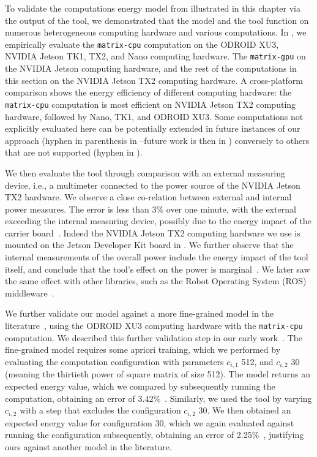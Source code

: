 To validate the computations energy model from  illustrated in this chapter via the output of the \powprof{} tool, we demonstrated that the model and the tool function on numerous heterogeneous computing hardware and various computations. In , we empirically evaluate the {\small\tt matrix-cpu} computation on the ODROID XU3, NVIDIA Jetson TK1, TX2, and Nano computing hardware. The {\small\tt matrix-gpu} on the NVIDIA Jetson computing hardware, and the rest of the computations in this section on the NVIDIA Jetson TX2 computing hardware. A cross-platform comparison shows the energy efficiency of different computing hardware: the {\small\tt matrix-cpu} computation is most efficient on NVIDIA Jetson TX2 computing hardware, followed by Nano, TK1, and ODROID XU3. Some computations not explicitly evaluated here can be potentially extended in future instances of our approach (hyphen in parenthesis in --future work is then in ) conversely to others that are not supported (hyphen in ). 

We then evaluate the \powprof{} tool through comparison with an external measuring device, i.e., a multimeter connected to the power source of the NVIDIA Jetson TX2 hardware. We observe a close co-relation between external and internal power measures. The error is less than 3\% over one minute, with the external exceeding the internal measuring device, possibly due to the energy impact of the carrier board~\citep{seewald2019coarse}. Indeed the NVIDIA Jetson TX2 computing hardware we use is mounted on the Jetson Developer Kit board in . We further observe that the internal measurements of the overall power include the energy impact of the tool itself, and conclude that the tool's effect on the power is marginal~\citep{seewald2019coarse}. We later saw the same effect with other libraries, such as the Robot Operating System (ROS) middleware~\citep{zamanakos2020energy}.

We further validate our model against a more fine-grained model in the literature~\citep{nunez2013enabling,nikov2015evaluation}, using the ODROID XU3 computing hardware with the {\small\tt matrix-cpu} computation. We described this further validation step in our early work~\citep{seewald2019coarse}. The fine-grained model requires some apriori training, which we performed by evaluating the computation configuration with parameters $c_{i,1}$ 512, and $c_{i,2}$ 30 (meaning the thirtieth power of square matrix of size 512). The model returns an expected energy value, which we compared by subsequently running the computation, obtaining an error of 3.42\%~\citep{seewald2019coarse}. Similarly, we used the \powprof{} tool by varying $c_{i,2}$ with a step that excludes the configuration $c_{i,2}$ 30. We then obtained an expected energy value for configuration 30, which we again evaluated against running the configuration subsequently, obtaining an error of 2.25\%~\citep{seewald2019coarse}, justifying ours against another model in the literature. 


